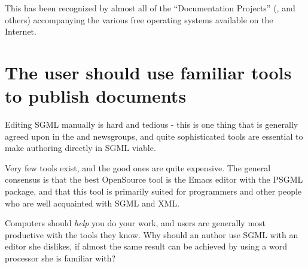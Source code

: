 This has been recognized by almost all of the ``Documentation
Projects'' (,  and others) accompanying the various
free operating systems available on the Internet.









\section{The user should use familiar tools to publish documents}
\label{sec:the-user-should-use-familiar-tools-to-publish-documents}

Editing SGML manually is hard and tedious - this is one
thing that is generally agreed upon in the
 and
newsgroups, and quite sophisticated tools are essential to
make authoring directly in SGML viable.

Very few tools exist, and the good ones are quite expensive.  The
general consensus is that the best OpenSource tool is the Emacs editor
with the PSGML package, and that
this tool is primarily suited for programmers and other people who are
well acquainted with SGML and XML.

Computers should \textit{help} you do your work, and users are
generally most productive with the tools they know.  Why should an
author use SGML with an editor she dislikes, if almost the same result
can be achieved by using a word processor she is familiar with?

